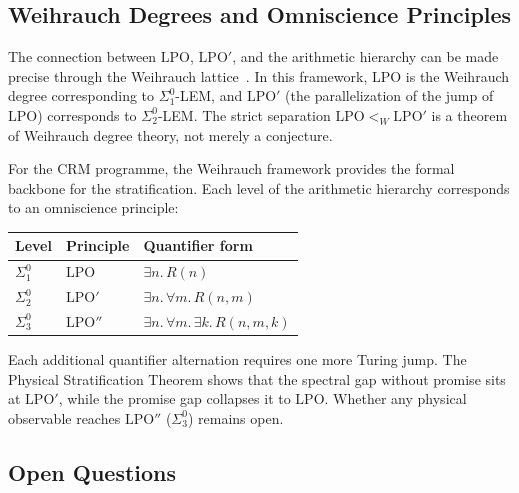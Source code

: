 \documentclass[11pt,a4paper]{article}
\theoremstyle{plain}
\theoremstyle{definition}
\newcommand{\LPO}{\ensuremath{\mathrm{LPO}}}
\newcommand{\LPOj}{\ensuremath{\mathrm{LPO'}}}
\begin{document}
\subsection{Weihrauch Degrees and Omniscience Principles}

The connection between $\LPO$, $\LPOj$, and the arithmetic hierarchy
can be made precise through the Weihrauch lattice~\cite{BrattkaEtAl2012}.
In this framework, $\LPO$ is the Weihrauch degree corresponding to
$\Sigma_1^0$-LEM, and $\LPOj$ (the parallelization of the jump of $\LPO$)
corresponds to $\Sigma_2^0$-LEM.  The strict separation
$\LPO <_W \LPOj$ is a theorem of Weihrauch degree theory, not merely
a conjecture.

For the CRM programme, the Weihrauch framework provides the formal
backbone for the stratification.  Each level of the arithmetic hierarchy
corresponds to an omniscience principle:
\begin{center}
\begin{tabular}{@{}lll@{}}
\toprule
\textbf{Level} & \textbf{Principle} & \textbf{Quantifier form} \\
\midrule
$\Sigma_1^0$ & $\LPO$ & $\exists n.\, R(n)$ \\
$\Sigma_2^0$ & $\LPOj$ & $\exists n.\, \forall m.\, R(n,m)$ \\
$\Sigma_3^0$ & $\LPO''$ & $\exists n.\, \forall m.\, \exists k.\, R(n,m,k)$ \\
\bottomrule
\end{tabular}
\end{center}
Each additional quantifier alternation requires one more Turing jump.
The Physical Stratification Theorem shows that the spectral gap without
promise sits at $\LPOj$, while the promise gap collapses it to $\LPO$.
Whether any physical observable reaches $\LPO''$ ($\Sigma_3^0$) remains
open.

\subsection{Open Questions}
\end{document}
